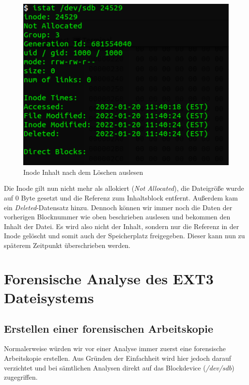 \begin{figure}[H]
	\centering
	\includegraphics[width=12cm,keepaspectratio=true]{pictures/istatafterdelete.png}
	\caption{
		Inode Inhalt nach dem Löschen auslesen
	}
	\label{fig:istatafterdelete}
\end{figure}

Die Inode gilt nun nicht mehr als allokiert (\textit{Not Allocated}), die Dateigröße wurde auf 0 Byte gesetzt und die Referenz zum Inhaltsblock entfernt. Außerdem kam ein \textit{Deleted}-Datensatz hinzu. Dennoch können wir immer noch die Daten der vorherigen Blocknummer wie oben beschrieben auslesen und bekommen den Inhalt der Datei. Es wird also nicht der Inhalt, sondern nur die Referenz in der Inode gelöscht und somit auch der Speicherplatz freigegeben. Dieser kann nun zu späterem Zeitpunkt überschrieben werden.

\newpage

\section{Forensische Analyse des EXT3 Dateisystems}

\subsection{Erstellen einer forensischen Arbeitskopie}

Normalerweise würden wir vor einer Analyse immer zuerst eine forensische Arbeitskopie erstellen. Aus Gründen der Einfachheit wird hier jedoch darauf verzichtet und bei sämtlichen Analysen direkt auf das Blockdevice (\textit{/dev/sdb}) zugegriffen.

